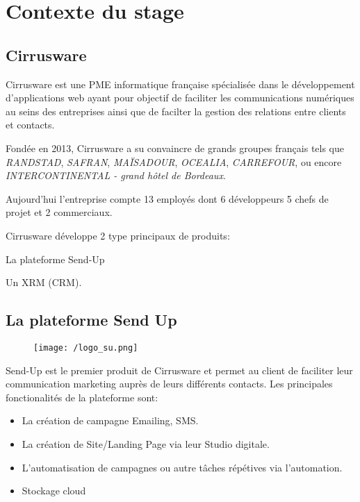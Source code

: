 \section{Contexte du stage}
\subsection{Cirrusware}
Cirrusware est une PME informatique française spécialisée dans le développement d'applications web ayant pour objectif de faciliter les communications numériques au seins des entreprises ainsi que de facilter la gestion des relations entre clients et contacts. 

Fondée en 2013, Cirrusware a su convaincre de grands groupes français tels que \textit{RANDSTAD}, \textit{SAFRAN}, \textit{MAÏSADOUR}, \textit{OCEALIA}, \textit{CARREFOUR}, ou encore \textit{INTERCONTINENTAL - grand hôtel de Bordeaux}.


Aujourd'hui l'entreprise compte 13 employés dont 6 développeurs 5 chefs de projet et 2 commerciaux. 


Cirrusware développe 2 type principaux de produits: 
\begin{list}{}{}
    \item La plateforme Send-Up\cite{sendup}
    \item Un XRM (CRM).
\end{list}

\subsection{La plateforme Send Up}
\begin{figure}[!h]
\centering
    \texttt{[image: /logo\_su.png]}

\end{figure}
Send-Up est le premier produit de Cirrusware et permet au client de faciliter leur communication marketing auprès de leurs différents contacts.
Les principales fonctionalités de la plateforme sont:
\begin{itemize}
    \item La création de campagne Emailing, SMS. 
    \item La création de Site/Landing Page via leur Studio digitale.
    \item L'automatisation de campagnes ou autre tâches répétives via l'automation.
    \item Stockage cloud 
\end{itemize}


